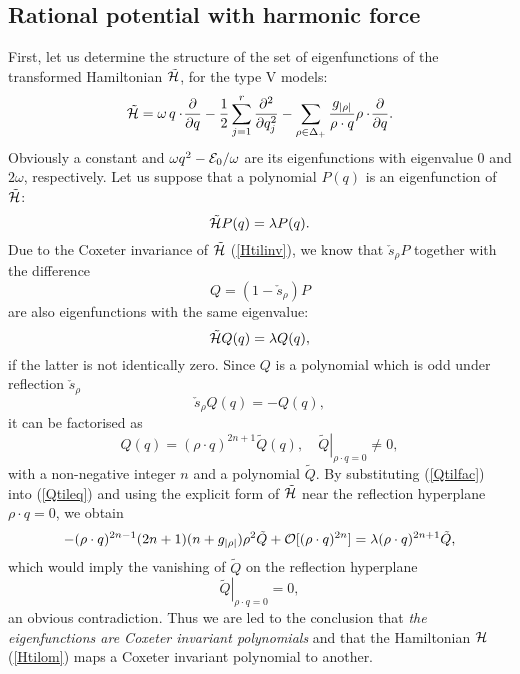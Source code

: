 \documentclass[a4paper,12pt]{article}
\begin{document}
\bigskip
\subsection{Rational potential with harmonic force}
\label{harmtri}
First, let us determine the structure of the set of eigenfunctions of the
transformed Hamiltonian \(\tilde{\cal H}\), for the type V models:
\begin{equation}
   \tilde{\cal H}=\omega\, q\cdot\!{\partial\over{\partial q}}
   -{1\over2}\sum_{j=1}^r{\partial^2\over{\partial q_j^2}}
   -\sum_{\rho\in\Delta_+}{g_{|\rho|}\over{\rho\cdot q}}
   \rho\cdot\!{\partial\over{\partial q}}.
   \label{Htilom}
\end{equation}
Obviously a constant and \(\omega q^2-{\cal E}_0/\omega\)
are its eigenfunctions
with eigenvalue 0 and \(2\omega\), respectively.
Let us suppose that a polynomial  \(P(q)\) is an eigenfunction
of \(\tilde{\cal H}\):
\begin{equation}
   \tilde{\cal H}P(q)=\lambda P(q).
   \label{htileigen}
\end{equation}
Due to the Coxeter invariance of \(\tilde{\cal H}\) (\ref{Htilinv}),
we know that \(\check{s}_{\rho}P\) together with the difference
\[
Q=(1-\check{s}_{\rho})P
\]
are also eigenfunctions with the same
eigenvalue:
\begin{equation}
   \tilde{\cal H}Q(q)=\lambda Q(q),
   \label{Qtileq}
\end{equation}
if the latter is not identically zero. Since \(Q\) is a polynomial which is
odd under reflection \(\check{s}_{\rho}\)
\[
   \check{s}_{\rho}Q(q)=-Q(q),
\]
it can be factorised as
\begin{equation}
   Q(q)=(\rho\cdot q)^{2n+1}\tilde{Q}(q),\quad
   \left.\tilde{Q}\right|_{\rho\cdot q=0}\neq0,
   \label{Qtilfac}
\end{equation}
with a non-negative integer \(n\) and a polynomial \(\tilde{Q}\).
By substituting (\ref{Qtilfac}) into  (\ref{Qtileq}) and using the
explicit form of \(\tilde{\cal H}\) near the reflection hyperplane
\(\rho\cdot q=0\), we obtain
\begin{equation}
   -(\rho\cdot q)^{2n-1}(2n+1)(n+g_{|\rho|})\rho^2\tilde{Q}
   +{\cal O}[(\rho\cdot q)^{2n}]=\lambda(\rho\cdot q)^{2n+1}\tilde{Q},
\end{equation}
which would imply the vanishing of \(\tilde{Q}\) on the reflection
hyperplane
\[
    \left.\tilde{Q}\right|_{\rho\cdot q=0}=0,
\]
an obvious contradiction.
Thus we are led to the conclusion that {\em the eigenfunctions are
Coxeter invariant polynomials\/} and that the Hamiltonian ${\cal H}$
(\ref{Htilom}) maps a Coxeter invariant polynomial to another.
\end{document}
